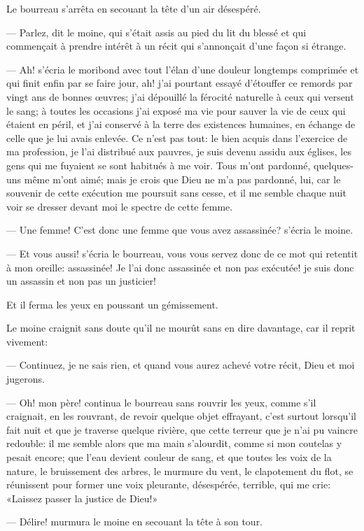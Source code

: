 Le bourreau s'arrêta en secouant la tête d'un air désespéré.

— Parlez, dit le moine, qui s'était assis au pied du lit du blessé et qui commençait à prendre intérêt à un récit qui s'annonçait d'une façon si étrange.

— Ah! s'écria le moribond avec tout l'élan d'une douleur longtemps comprimée et qui finit enfin par se faire jour, ah! j'ai pourtant essayé d'étouffer ce remords par vingt ans de bonnes œuvres; j'ai dépouillé la férocité naturelle à ceux qui versent le sang; à toutes les occasions j'ai exposé ma vie pour sauver la vie de ceux qui étaient en péril, et j'ai conservé à la terre des existences humaines, en échange de celle que je lui avais enlevée. Ce n'est pas tout: le bien acquis dans l'exercice de ma profession, je l'ai distribué aux pauvres, je suis devenu assidu aux églises, les gens qui me fuyaient se sont habitués à me voir. Tous m'ont pardonné, quelques-uns même m'ont aimé; mais je crois que Dieu ne m'a pas pardonné, lui, car le souvenir de cette exécution me poursuit sans cesse, et il me semble chaque nuit voir se dresser devant moi le spectre de cette femme.

— Une femme! C'est donc une femme que vous avez assassinée? s'écria le moine.

— Et vous aussi! s'écria le bourreau, vous vous servez donc de ce mot qui retentit à mon oreille: assassinée! Je l'ai donc assassinée et non pas exécutée! je suis donc un assassin et non pas un justicier!

Et il ferma les yeux en poussant un gémissement.

Le moine craignit sans doute qu'il ne mourût sans en dire davantage, car il reprit vivement:

— Continuez, je ne sais rien, et quand vous aurez achevé votre récit, Dieu et moi jugerons.

— Oh! mon père! continua le bourreau sans rouvrir les yeux, comme s'il craignait, en les rouvrant, de revoir quelque objet effrayant, c'est surtout lorsqu'il fait nuit et que je traverse quelque rivière, que cette terreur que je n'ai pu vaincre redouble: il me semble alors que ma main s'alourdit, comme si mon coutelas y pesait encore; que l'eau devient couleur de sang, et que toutes les voix de la nature, le bruissement des arbres, le murmure du vent, le clapotement du flot, se réunissent pour former une voix pleurante, désespérée, terrible, qui me crie: «Laissez passer la justice de Dieu!»

— Délire! murmura le moine en secouant la tête à son tour.

